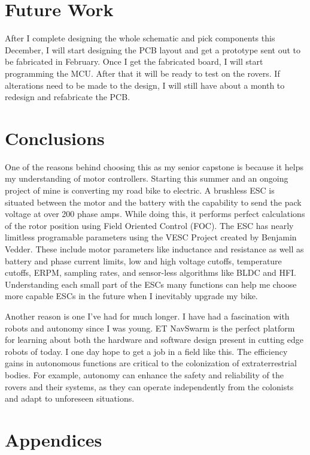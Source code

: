 \documentclass[conference]{IEEEtran}
\begin{document}
\section{Future Work}

After I complete designing the whole schematic and pick components this December, I will start designing the PCB layout and get a prototype sent out to be fabricated in February. Once I get the fabricated board, I will start programming the MCU. After that it will be ready to test on the rovers. If alterations need to be made to the design, I will still have about a month to redesign and refabricate the PCB.

\section{Conclusions}

One of the reasons behind choosing this as my senior capstone is because it helps my understanding of motor controllers. Starting this summer and an ongoing project of mine is converting my road bike to electric. A brushless ESC is situated between the motor and the battery with the capability to send the pack voltage at over 200 phase amps. While doing this, it performs perfect calculations of the rotor position using Field Oriented Control (FOC). The ESC has nearly limitless programable parameters using the VESC Project created by Benjamin Vedder. These include motor parameters like inductance and resistance as well as battery and phase current limits, low and high voltage cutoffs, temperature cutoffs, ERPM, sampling rates, and sensor-less algorithms like BLDC and HFI. Understanding each small part of the ESCs many functions can help me choose more capable ESCs in the future when I inevitably upgrade my bike.
\par Another reason is one I've had for much longer. I have had a fascination with robots and autonomy since I was young. ET NavSwarm is the perfect platform for learning about both the hardware and software design present in cutting edge robots of today. I one day hope to get a job in a field like this. The efficiency gains in autonomous functions are critical to the colonization of extraterrestrial bodies. For example, autonomy can enhance the safety and reliability of the rovers and their systems, as they can operate independently from the colonists and adapt to unforeseen situations.

\section{Appendices}
\end{document}
